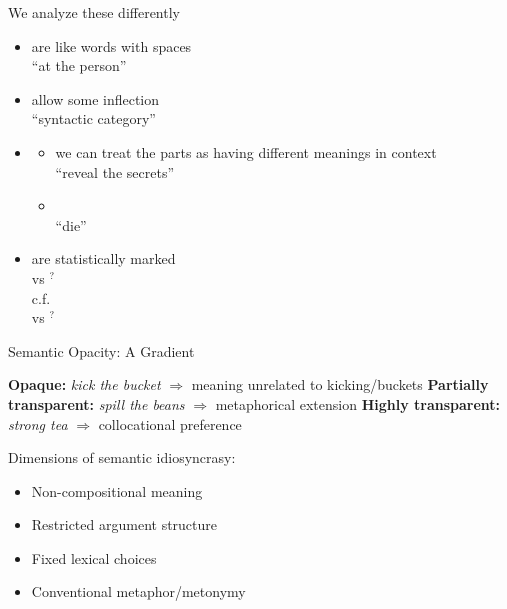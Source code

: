 \begin{frame}{We analyze these differently}

  \begin{itemize}
  \item {} are like words with spaces
    \\  ``at the person''
  \item {} allow some inflection
    \\  ``syntactic category''
  \item {} \citep{Nunberg:Sag:Wasow:1994}
    \begin{itemize}
    \item {} we can treat the parts as
      having different meanings in context
      \\  ``reveal the secrets''
    \item {}
      \\  ``die''
    \end{itemize}
  \item {} are statistically marked
    \\  vs $^?$
    \\ c.f.\  
    \\  vs $^?$
    
  \end{itemize}
  
\end{frame}

\begin{frame}{Semantic Opacity: A Gradient}

\begin{exe}
  \ex \textbf{Opaque:} \emph{kick the bucket} $\Rightarrow$ meaning unrelated to kicking/buckets
  \ex \textbf{Partially transparent:} \emph{spill the beans} $\Rightarrow$ metaphorical extension
  \ex \textbf{Highly transparent:} \emph{strong tea} $\Rightarrow$ collocational preference
\end{exe}


\vspace{0.5em}
Dimensions of semantic idiosyncrasy:
\begin{itemize}
  \item Non-compositional meaning
  \item Restricted argument structure
  \item Fixed lexical choices
  \item Conventional metaphor/metonymy
\end{itemize}
\end{frame}

